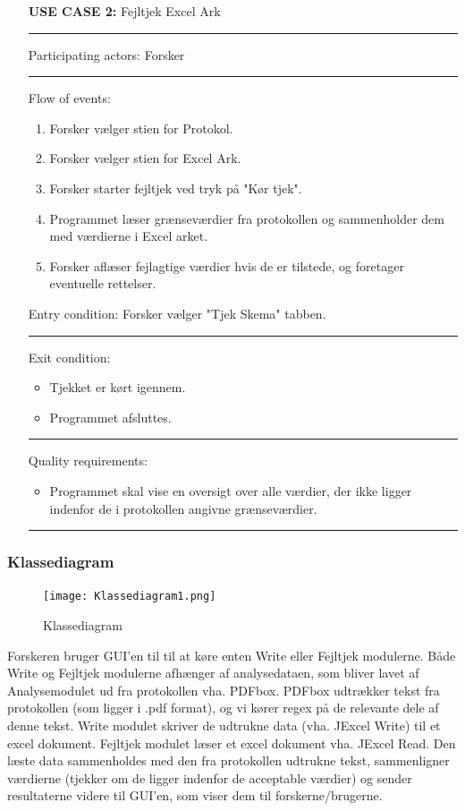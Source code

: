 \documentclass[11pt]{article}
\begin{document}
\begin{itemize}
\item[\textbf{USE CASE 2:}] Fejltjek Excel Ark\\
\noindent\rule{14cm}{0.4pt}
\item [Participating actors:] Forsker\\
\noindent\rule{14cm}{0.4pt}

\item [Flow of events:]
\begin{enumerate}
\item Forsker vælger stien for Protokol.
\item Forsker vælger stien for Excel Ark.
\item Forsker starter fejltjek ved tryk på "Kør tjek".
\item Programmet læser grænseværdier fra protokollen og sammenholder dem med værdierne i Excel arket.
\item Forsker aflæser fejlagtige værdier hvis de er tilstede, og foretager eventuelle rettelser.
\end{enumerate}
\item [Entry condition:] Forsker vælger "Tjek Skema" tabben.\\
\noindent\rule{14cm}{0.4pt}

\item [Exit condition:]
\begin{itemize}
\item Tjekket er kørt igennem.
\item Programmet afsluttes.
\end{itemize}
\noindent\rule{14cm}{0.4pt}

\item [Quality requirements:]
\begin{itemize}
\item Programmet skal vise en oversigt over alle værdier, der ikke ligger indenfor de i protokollen
angivne grænseværdier. \\
\end{itemize}
\noindent\rule{14cm}{0.4pt}

\end{itemize}

\subsubsection{Klassediagram}
\begin{figure}[h!]
\texttt{[image: Klassediagram1.png]}
\caption{Klassediagram}
\end{figure}
Forskeren bruger GUI'en til til at køre enten Write eller Fejltjek modulerne. Både Write og Fejltjek modulerne afhænger af analysedataen, som bliver lavet af Analysemodulet ud fra protokollen vha. PDFbox. PDFbox udtrækker tekst fra protokollen (som ligger i .pdf format), og vi kører regex på de relevante dele af denne tekst. Write modulet skriver de udtrukne data (vha. JExcel Write) til et excel dokument. Fejltjek modulet læser et excel dokument vha. JExcel Read. Den læste data sammenholdes med den fra protokollen udtrukne tekst, sammenligner værdierne (tjekker om de ligger indenfor de acceptable værdier) og sender resultaterne videre til GUI'en, som viser dem til forskerne/brugerne.
\end{document}

